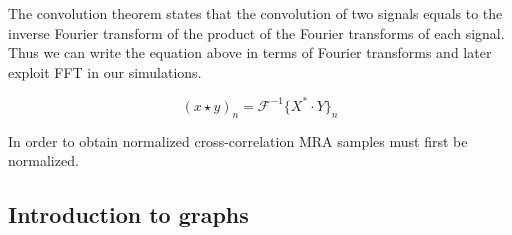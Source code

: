 The convolution theorem states that the convolution of two signals  equals to the inverse Fourier transform of the product of the Fourier transforms of each signal. Thus we can write the equation above in terms of Fourier transforms and later exploit \acrshort{FFT} in our simulations.

\begin{equation}
(x \star y)_n = \mathcal{F}^{-1}\lbrace X^* \cdot Y {\rbrace}_n
\end{equation}

In order to obtain normalized cross-correlation \acrshort{MRA} samples must first be normalized.

\subsection{Introduction to graphs}

